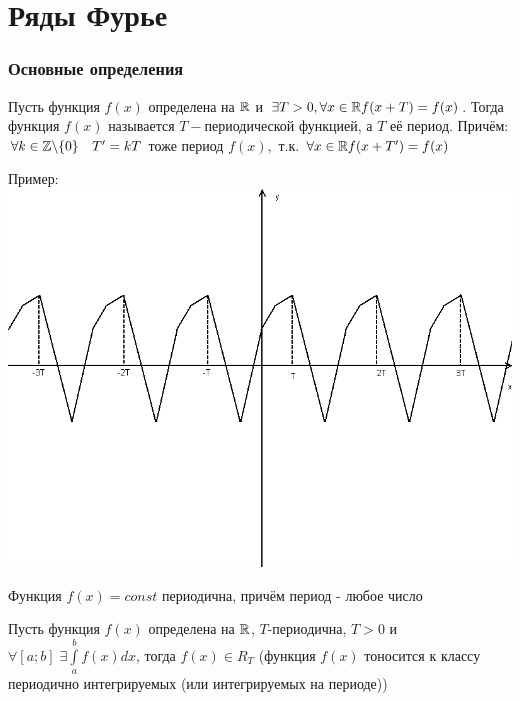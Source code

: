 \part{Ряды Фурье}
\section{Основные определения}

\begin{Def}
	Пусть функция $f(x)$ определена на $\mathbb{R}$ и $\exists T > 0, \;\\
	\forall x \in \mathbb{R} f(x+T) = f(x)$. Тогда функция $f(x)$ называется $T-$периодической функцией, а $T$ \textendash её период. Причём:\\
	$\forall k \in \mathbb{Z} \backslash \{0\} \quad T' = kT$ тоже период $f(x),$ т.к. $\forall x \in \mathbb{R} f(x+T') = f(x)$
\end{Def}

Пример:\\
\includegraphics[width=1.0\textwidth]{pictures/5_1_1.png}

\begin{Note}
	Функция $f(x) = const$ периодична, причём период - любое число
\end{Note}

\begin{Def}
	Пусть функция $f(x)$ определена на $\mathbb{R}$, $T$-периодична, $T > 0$ и $\forall [a;b] \; \exists \int\limits_{a}^{b}f(x)dx$, тогда $f(x) \in R_T$ (функция $f(x)$ тоносится к классу периодично интегрируемых (или интегрируемых на периоде))%
\end{Def}

